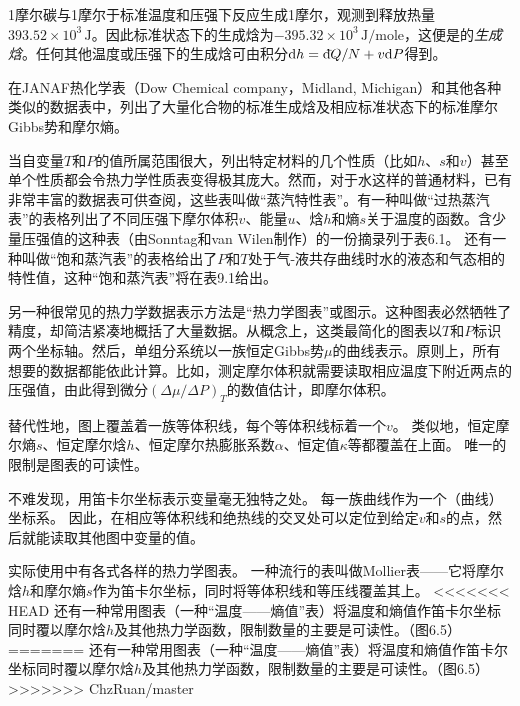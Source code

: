 1摩尔碳与1摩尔于标准温度和压强下反应生成1摩尔，观测到释放热量$393.52\times10^3\,\text{J}$。因此标准状态下的生成焓为$-395.32\times10^3 \, \text{J}/\text{mole}$，这便是的{\it 生成焓}。任何其他温度或压强下的生成焓可由积分$\mathrm{d} h=\mathrm d\hspace*{-0.1em}\bar{}\hspace*{0.08em} Q/N + v\mathrm{d} P$得到。

在JANAF热化学表（Dow Chemical company，Midland, Michigan）和其他各种类似的数据表中，列出了大量化合物的标准生成焓及相应标准状态下的标准摩尔Gibbs势和摩尔熵。

当自变量$T$和$P$的值所属范围很大，列出特定材料的几个性质（比如$h$、$s$和$v$）甚至单个性质都会令热力学性质表变得极其庞大。然而，对于水这样的普通材料，已有非常丰富的数据表可供查阅，这些表叫做“蒸汽特性表”。有一种叫做“过热蒸汽表”的表格列出了不同压强下摩尔体积$v$、能量$u$、焓$h$和熵$s$关于温度的函数。含少量压强值的这种表（由Sonntag和van Wilen制作）的一份摘录列于表6.1。%
还有一种叫做“饱和蒸汽表”的表格给出了$P$和$T$处于气-液共存曲线时水的液态和气态相的特性值，这种“饱和蒸汽表”将在表9.1给出。%

另一种很常见的热力学数据表示方法是“热力学图表”或图示。这种图表必然牺牲了精度，却简洁紧凑地概括了大量数据。从概念上，这类最简化的图表以$T$和$P$标识两个坐标轴。然后，单组分系统以一族恒定Gibbs势$\mu$的曲线表示。原则上，所有想要的数据都能依此计算。比如，测定摩尔体积就需要读取相应温度下附近两点的压强值，由此得到微分$\left(\Delta\mu/\Delta P\right)_T$的数值估计，即摩尔体积。

替代性地，图上覆盖着一族等体积线，每个等体积线标着一个$v$。
类似地，恒定摩尔熵$s$、恒定摩尔焓$h$、恒定摩尔热膨胀系数$\alpha$、恒定值$\kappa$等都覆盖在上面。
唯一的限制是图表的可读性。

不难发现，用笛卡尔坐标表示变量毫无独特之处。
每一族曲线作为一个（曲线）坐标系。
因此，在相应等体积线和绝热线的交叉处可以定位到给定$v$和$s$的点，然后就能读取其他图中变量的值。

实际使用中有各式各样的热力学图表。
一种流行的表叫做Mollier表——它将摩尔焓$h$和摩尔熵$s$作为笛卡尔坐标，同时将等体积线和等压线覆盖其上。
<<<<<<< HEAD
还有一种常用图表（一种“温度——熵值”表）将温度和熵值作笛卡尔坐标同时覆以摩尔焓$h$及其他热力学函数，限制数量的主要是可读性。（图6.5）%
=======
还有一种常用图表（一种“温度——熵值”表）将温度和熵值作笛卡尔坐标同时覆以摩尔焓$h$及其他热力学函数，限制数量的主要是可读性。（图6.5）%
>>>>>>> ChzRuan/master

